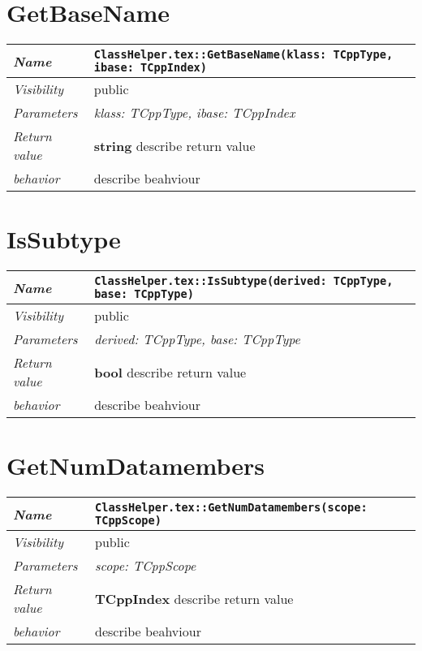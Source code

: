 \section{GetBaseName}
\begin{longtable}{p{3cm} @{\hskip 1cm} p{12cm}}
 \hline
\textit{Name} & \texttt{ClassHelper.tex::GetBaseName(klass: TCppType, ibase: TCppIndex)}\\
\hline
 \textit{Visibility} & public\\
\hline
\textit{Parameters} & \textit{klass: TCppType, ibase: TCppIndex}\\
\hline
\textit{Return value} & \textbf{ string} describe return value\\
  \hline
 \textit{behavior} & describe beahviour \\
\hline
\end{longtable} \pagebreak
 \section{IsSubtype}
\begin{longtable}{p{3cm} @{\hskip 1cm} p{12cm}}
 \hline
\textit{Name} & \texttt{ClassHelper.tex::IsSubtype(derived: TCppType, base: TCppType)}\\
\hline
 \textit{Visibility} & public\\
\hline
\textit{Parameters} & \textit{derived: TCppType, base: TCppType}\\
\hline
\textit{Return value} & \textbf{ bool} describe return value\\
  \hline
 \textit{behavior} & describe beahviour \\
\hline
\end{longtable} \pagebreak
 \section{GetNumDatamembers}
\begin{longtable}{p{3cm} @{\hskip 1cm} p{12cm}}
 \hline
\textit{Name} & \texttt{ClassHelper.tex::GetNumDatamembers(scope: TCppScope)}\\
\hline
 \textit{Visibility} & public\\
\hline
\textit{Parameters} & \textit{scope: TCppScope}\\
\hline
\textit{Return value} & \textbf{ TCppIndex} describe return value\\
  \hline
 \textit{behavior} & describe beahviour \\
\hline
\end{longtable} \pagebreak

